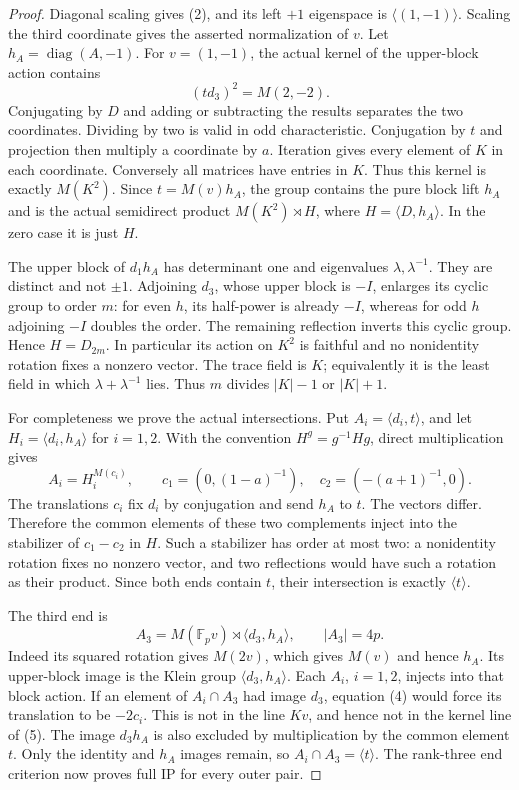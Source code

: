\documentclass[11pt]{article}
\newcommand{\F}{\mathbb F}\newcommand{\gen}[1]{\langle#1\rangle}
\begin{document}
\begin{proof}
Diagonal scaling gives (2), and its left $+1$ eigenspace is
$\gen{(1,-1)}$. Scaling the third coordinate gives the asserted
normalization of $v$. Let $h_A=\operatorname{diag}(A,-1)$.
For $v=(1,-1)$, the actual kernel of the upper-block action contains
\[
                        (t d_3)^2=M(2,-2).
\]
Conjugating by $D$ and adding or subtracting the results separates
the two coordinates. Dividing by two is valid in odd characteristic.
Conjugation by $t$ and projection then multiply a coordinate by $a$.
Iteration gives every element of $K$ in each coordinate. Conversely
all matrices have entries in $K$. Thus this kernel is exactly $M(K^2)$.
Since $t=M(v)h_A$, the group contains the pure block lift $h_A$ and
is the actual semidirect product $M(K^2)\rtimes H$, where
$H=\gen{D,h_A}$. In the zero case it is just $H$.

The upper block of $d_1h_A$ has determinant one and eigenvalues
$\lambda,\lambda^{-1}$. They are distinct and not $\pm1$.
Adjoining $d_3$, whose upper block is $-I$, enlarges its cyclic group
to order $m$: for even $h$, its half-power is already $-I$, whereas
for odd $h$ adjoining $-I$ doubles the order. The remaining reflection
inverts this cyclic group. Hence $H=D_{2m}$. In particular its action
on $K^2$ is faithful and no nonidentity rotation fixes a nonzero vector.
The trace field is $K$; equivalently it is the least field in which
$\lambda+\lambda^{-1}$ lies. Thus $m$ divides $|K|-1$ or $|K|+1$.

For completeness we prove the actual intersections. Put
$A_i=\gen{d_i,t}$, and let $H_i=\gen{d_i,h_A}$ for $i=1,2$.
With the convention $H^g=g^{-1}Hg$, direct multiplication gives
\[
 A_i=H_i^{M(c_i)},\qquad
 c_1=(0,(1-a)^{-1}),\quad c_2=(-(a+1)^{-1},0).          \tag{4}
\]
The translations $c_i$ fix $d_i$ by conjugation and send $h_A$ to $t$.
The vectors differ. Therefore the common elements of these two
complements inject into the stabilizer of $c_1-c_2$ in $H$.
Such a stabilizer has order at most two: a nonidentity rotation fixes
no nonzero vector, and two reflections would have such a rotation
as their product. Since both ends contain $t$, their intersection
is exactly $\gen{t}$.

The third end is
\[
 A_3=M(\F_p v)\rtimes\gen{d_3,h_A},\qquad |A_3|=4p.   \tag{5}
\]
Indeed its squared rotation gives $M(2v)$, which gives $M(v)$ and
hence $h_A$. Its upper-block image is the Klein group
$\gen{d_3,h_A}$. Each $A_i$, $i=1,2$, injects into that block action.
If an element of $A_i\cap A_3$ had image $d_3$, equation (4) would
force its translation to be $-2c_i$. This is not in the line $Kv$,
and hence not in the kernel line of (5). The image $d_3h_A$ is also
excluded by multiplication by the common element $t$. Only the
identity and $h_A$ images remain, so $A_i\cap A_3=\gen{t}$.
The rank-three end criterion now proves full IP for every outer pair.


\end{proof}
\end{document}
